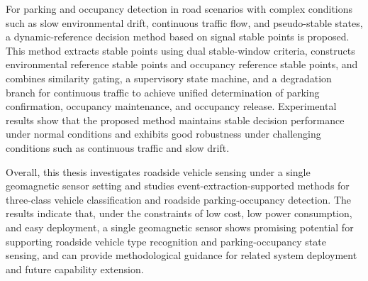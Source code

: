 For parking and occupancy detection in road scenarios with complex conditions such as slow environmental drift, continuous traffic flow, and pseudo-stable states, a dynamic-reference decision method based on signal stable points is proposed. This method extracts stable points using dual stable-window criteria, constructs environmental reference stable points and occupancy reference stable points, and combines similarity gating, a supervisory state machine, and a degradation branch for continuous traffic to achieve unified determination of parking confirmation, occupancy maintenance, and occupancy release. Experimental results show that the proposed method maintains stable decision performance under normal conditions and exhibits good robustness under challenging conditions such as continuous traffic and slow drift.

Overall, this thesis investigates roadside vehicle sensing under a single geomagnetic sensor setting and studies event-extraction-supported methods for three-class vehicle classification and roadside parking-occupancy detection. The results indicate that, under the constraints of low cost, low power consumption, and easy deployment, a single geomagnetic sensor shows promising potential for supporting roadside vehicle type recognition and parking-occupancy state sensing, and can provide methodological guidance for related system deployment and future capability extension.
